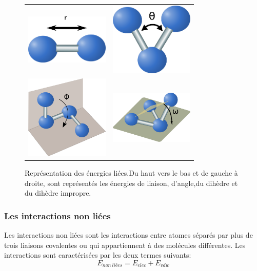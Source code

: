    \begin{figure}[!htbp]
     \centering
     \begin{tabular}{cc}
       \includegraphics[width=4cm]{figure/liaison.png} &
       \includegraphics[width=4cm]{figure/angle.png} \\
       \includegraphics[width=4cm]{figure/dihedre.png} &
       \includegraphics[width=4cm]{figure/impropre.png} \\

     \end{tabular}
     
     \caption{Représentation des énergies liées.Du haut vers le bas et de gauche à droite, sont représentés les énergies de liaison, d'angle,du dihèdre et du dihèdre impropre.}
\label{graph:E_liees}
   \end{figure}



\subsubsection{Les interactions non liées}
Les interactions non liées sont les interactions entre atomes séparés par plus de trois liaisons covalentes ou qui appartiennent à des molécules différentes. Les interactions sont caractérisées par les deux termes suivants:
\begin{equation}
E_{non\ liées} = E_{elec} + E_{vdw}  
\end{equation}


